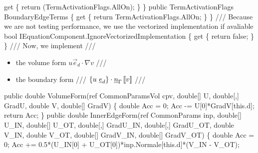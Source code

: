 {\btab \btab get \{ return (TermActivationFlags.AllOn); \} \newline 
\btab \} \newline 
 \newline 
\btab public TermActivationFlags BoundaryEdgeTerms \{ \newline 
\btab    get \{ return TermActivationFlags.AllOn; \} \newline 
\btab \} \newline 
	/// Because we are not testing performance, we use the vectorized implementation if avaliable
\btab bool IEquationComponent.IgnoreVectorizedImplementation \{ \newline 
\btab \btab get \{ return false; \} \newline 
\btab \} \newline 
 \newline 
    /// Now, we implement 
    /// \begin{itemize}
    ///    \item the volume form $u \vec{e}_d \cdot \nabla v$
    ///    \item the boundary form 
    ///       $\mean{u \ \vec{e}_d} \cdot \vec{n}_\Gamma \jump{v}$
    /// \end{itemize}
\btab public double VolumeForm(ref CommonParamsVol cpv,  \newline 
\btab \btab    double[] U, double[,] GradU,  \newline 
\btab \btab    double V, double[] GradV) \{ \newline 
 \newline 
\btab \btab double Acc = 0; \newline 
\btab \btab Acc -= U[0]*GradV[this.d]; \newline 
\btab \btab return Acc; \newline 
\btab \}         \newline 
 \newline 
\btab public double InnerEdgeForm(ref CommonParams inp,  \newline 
\btab \btab double[] U\_IN, double[] U\_OT, double[,] GradU\_IN, double[,] GradU\_OT,  \newline 
\btab \btab double V\_IN, double V\_OT, double[] GradV\_IN, double[] GradV\_OT) \{ \newline 
 \newline 
\btab \btab double Acc = 0; \newline 
\btab \btab Acc += 0.5*(U\_IN[0] + U\_OT[0])*inp.Normale[this.d]*(V\_IN - V\_OT); \newline 
}
